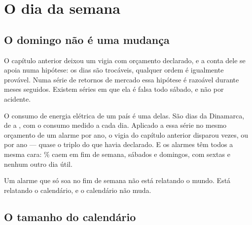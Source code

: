 %
%
%

\chapter{O dia da semana}
\label{cap:calendario}

\section{O domingo não é uma mudança}

O capítulo anterior deixou um vigia com orçamento declarado, e a conta dele se apoia numa
hipótese: os dias são trocáveis, qualquer ordem é igualmente provável. Numa série de retornos
de mercado essa hipótese é razoável durante meses seguidos. Existem séries em que ela é falsa
todo sábado, e não por acidente.

O consumo de energia elétrica de um país é uma delas. São \numCalendarioSerieDias{} dias da
Dinamarca, de \numCalendarioSerieInicio{} a \numCalendarioSerieFim, com o consumo medido a cada
dia. Aplicado a essa série no mesmo orçamento de um alarme por ano, o vigia do capítulo
anterior disparou \numCalendarioCruAlarmes{} vezes, ou \numCalendarioCruAlarmesAno{} por ano
--- quase o triplo do que havia declarado. E os alarmes têm todos a mesma cara:
\numCalendarioCruFimDeSemanaPct\% caem em fim de semana, \numCalendarioCruSabado{} sábados e
\numCalendarioCruDomingo{} domingos, com \numCalendarioCruSexta{} sextas e nenhum outro dia
útil.

Um alarme que só soa no fim de semana não está relatando o mundo. Está relatando o calendário,
e o calendário não muda.

\section{O tamanho do calendário}

